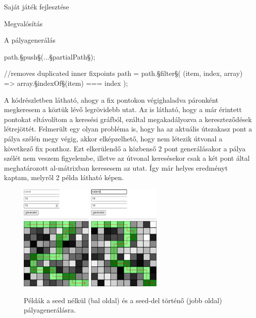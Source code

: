 \begin{MyChapter}{Saját játék fejlesztése}
\begin{MySection}{Megvalósítás}
\begin{MySubSection}{A pályagenerálás}
\begin{javascript}
{	path.§\color{jsMethod}push§(...§\color{jsConst}partialPath§);
}

//removes duplicated inner fixpoints
path = path.§\color{jsMethod}filter§(
	(item, index, array) => array.§\color{jsMethod}indexOf§(item) === index
);
			\end{javascript}
			A kódrészletben látható, ahogy a fix pontokon végighaladva páronként megkeresem a köztük lévő legrövidebb utat. Az is látható, hogy a már érintett pontokat eltávolítom a keresési gráfból, ezáltal megakadályozva a kereszteződések létrejöttét. Felmerült egy olyan probléma is, hogy ha az aktuális útszakasz pont a pálya szélén megy végig, akkor elképzelhető, hogy nem létezik útvonal a következő fix ponthoz. Ezt elkerülendő a közbenső 2 pont generálásakor a pálya szélét nem veszem figyelembe, illetve az útvonal keresésekor csak a két pont által meghatározott al-mátrixban keresesem az utat. Így már helyes eredményt kaptam, melyről 2 példa látható  képen.
			
			\begin{figure}[H]
				\centering
				\includegraphics[width=0.31\textwidth]{kepek/map/generate-example-1.png}
				\hspace{5mm}
				\includegraphics[width=0.31\textwidth]{kepek/map/generate-example-2.png}
				
				\caption{Példák a seed nélkül (bal oldal) és a seed-del történő (jobb oldal) pályagenerálásra.}
				\label{fig:map:generateExample}
			\end{figure}
			

\end{MySubSection}
\end{MySection}
\end{MyChapter}
